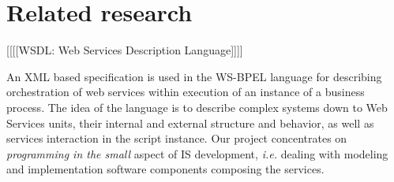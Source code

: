\documentclass[conference,a4paper]{IEEEtran}
\begin{document}
\section{Related research}
\label{sec:rel}

[[[[WSDL: Web Services Description Language]]]]

An XML based specification is used in the WS-BPEL language \cite{wsbpel} for describing orchestration of web services within execution of an instance of a business process.  The idea of the language is to describe complex systems down to Web Services units, their internal and external structure and behavior, as well as services interaction in the script instance. Our project concentrates on \emph{programming in the small} aspect of IS development, \emph{i.e.} dealing with modeling and implementation software components composing the services.






%
%

\end{document}
